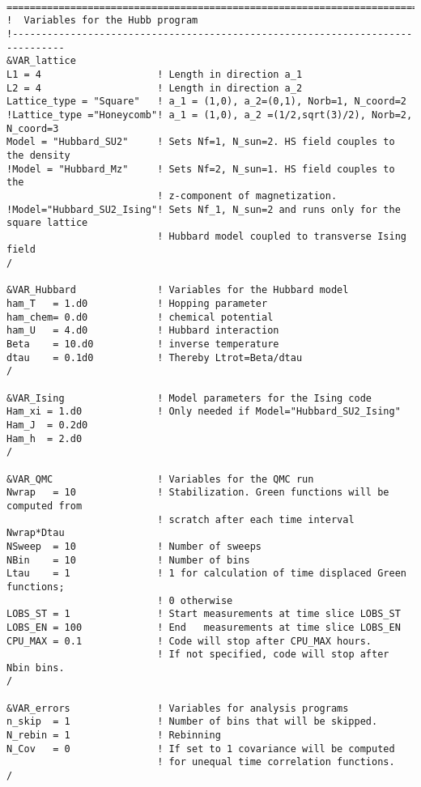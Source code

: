 \begin{lstlisting} 

===============================================================================
!  Variables for the Hubb program
!-------------------------------------------------------------------------------
&VAR_lattice
L1 = 4                    ! Length in direction a_1
L2 = 4                    ! Length in direction a_2
Lattice_type = "Square"	  ! a_1 = (1,0), a_2=(0,1), Norb=1, N_coord=2
!Lattice_type ="Honeycomb"! a_1 = (1,0), a_2 =(1/2,sqrt(3)/2), Norb=2, N_coord=3
Model = "Hubbard_SU2"     ! Sets Nf=1, N_sun=2. HS field couples to the density
!Model = "Hubbard_Mz"     ! Sets Nf=2, N_sun=1. HS field couples to the 
                          ! z-component of magnetization.  
!Model="Hubbard_SU2_Ising"! Sets Nf_1, N_sun=2 and runs only for the square lattice
                          ! Hubbard model coupled to transverse Ising field
/

&VAR_Hubbard              ! Variables for the Hubbard model
ham_T   = 1.d0            ! Hopping parameter
ham_chem= 0.d0            ! chemical potential
ham_U   = 4.d0            ! Hubbard interaction
Beta    = 10.d0           ! inverse temperature
dtau    = 0.1d0           ! Thereby Ltrot=Beta/dtau
/

&VAR_Ising                ! Model parameters for the Ising code
Ham_xi = 1.d0             ! Only needed if Model="Hubbard_SU2_Ising"
Ham_J  = 0.2d0
Ham_h  = 2.d0
/

&VAR_QMC                  ! Variables for the QMC run
Nwrap   = 10              ! Stabilization. Green functions will be computed from 
                          ! scratch after each time interval Nwrap*Dtau
NSweep  = 10              ! Number of sweeps
NBin    = 10              ! Number of bins
Ltau    = 1               ! 1 for calculation of time displaced Green functions;
                          ! 0 otherwise
LOBS_ST = 1               ! Start measurements at time slice LOBS_ST
LOBS_EN = 100             ! End   measurements at time slice LOBS_EN
CPU_MAX = 0.1             ! Code will stop after CPU_MAX hours. 
                          ! If not specified, code will stop after Nbin bins.
/

&VAR_errors               ! Variables for analysis programs
n_skip  = 1               ! Number of bins that will be skipped. 
N_rebin = 1               ! Rebinning  
N_Cov   = 0               ! If set to 1 covariance will be computed
                          ! for unequal time correlation functions.                   
/            
\end{lstlisting}
%

